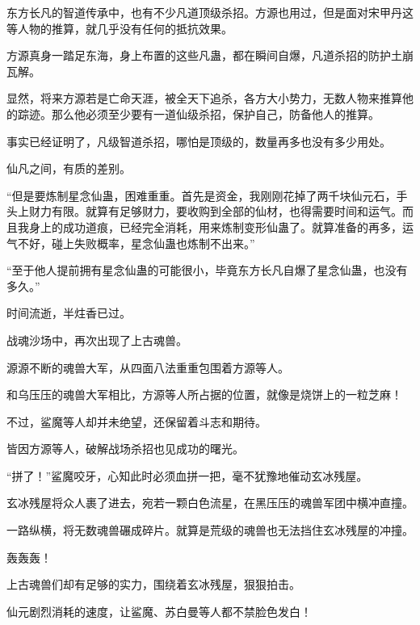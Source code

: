 \begin{this_body}
东方长凡的智道传承中，也有不少凡道顶级杀招。方源也用过，但是面对宋甲丹这等人物的推算，就几乎没有任何的抵抗效果。

方源真身一踏足东海，身上布置的这些凡蛊，都在瞬间自爆，凡道杀招的防护土崩瓦解。

显然，将来方源若是亡命天涯，被全天下追杀，各方大小势力，无数人物来推算他的踪迹。那么他必须至少要有一道仙级杀招，保护自己，防备他人的推算。

事实已经证明了，凡级智道杀招，哪怕是顶级的，数量再多也没有多少用处。

仙凡之间，有质的差别。

“但是要炼制星念仙蛊，困难重重。首先是资金，我刚刚花掉了两千块仙元石，手头上财力有限。就算有足够财力，要收购到全部的仙材，也得需要时间和运气。而且我身上的成功道痕，已经完全消耗，用来炼制变形仙蛊了。就算准备的再多，运气不好，碰上失败概率，星念仙蛊也炼制不出来。”

“至于他人提前拥有星念仙蛊的可能很小，毕竟东方长凡自爆了星念仙蛊，也没有多久。”

时间流逝，半炷香已过。

战魂沙场中，再次出现了上古魂兽。

源源不断的魂兽大军，从四面八法重重包围着方源等人。

和乌压压的魂兽大军相比，方源等人所占据的位置，就像是烧饼上的一粒芝麻！

不过，鲨魔等人却并未绝望，还保留着斗志和期待。

皆因方源等人，破解战场杀招也见成功的曙光。

“拼了！”鲨魔咬牙，心知此时必须血拼一把，毫不犹豫地催动玄冰残屋。

玄冰残屋将众人裹了进去，宛若一颗白色流星，在黑压压的魂兽军团中横冲直撞。

一路纵横，将无数魂兽碾成碎片。就算是荒级的魂兽也无法挡住玄冰残屋的冲撞。

轰轰轰！

上古魂兽们却有足够的实力，围绕着玄冰残屋，狠狠拍击。

仙元剧烈消耗的速度，让鲨魔、苏白曼等人都不禁脸色发白！

\end{this_body}

